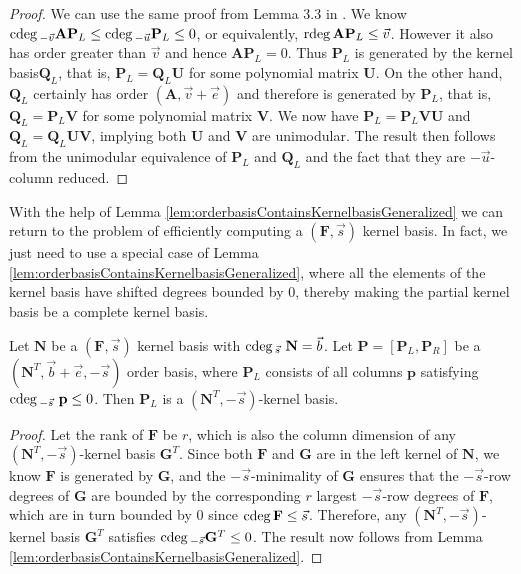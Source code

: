 \begin{proof}
We can use the same proof from Lemma 3.3 in \cite{za2012}. We know
${\rm cdeg}\,_{-\vec{v}}\mathbf{A}\mathbf{P}_{L}\le{\rm cdeg}\,_{-\vec{u}}\mathbf{P}_{L}\le0$,
or equivalently, ${\rm rdeg}\,\mathbf{A}\mathbf{P}_{L}\le\vec{v}$. However
it also has order greater than $\vec{v}$ and hence $\mathbf{A}\mathbf{P}_{L}=0$.
Thus $\mathbf{P}_{L}$ is generated by the kernel basis$\mathbf{Q}_{L}$,
that is, $\mathbf{P}_{L}=\mathbf{Q}_{L}\mathbf{U}$ for some polynomial
matrix $\mathbf{U}$. On the other hand, $\mathbf{Q}_{L}$ certainly
has order $\left(\mathbf{A},\vec{v}+\vec{e}\right)$ and therefore
is generated by $\mathbf{P}_{L}$, that is, $\mathbf{Q}_{L}=\mathbf{P}_{L}\mathbf{V}$
for some polynomial matrix $\mathbf{V}$. We now have $\mathbf{P}_{L}=\mathbf{P}_{L}\mathbf{V}\mathbf{U}$
and $\mathbf{Q}_{L}=\mathbf{Q}_{L}\mathbf{U}\mathbf{V}$, implying
both $\mathbf{U}$ and $\mathbf{V}$ are unimodular. The result then
follows from the unimodular equivalence of $\mathbf{P}_{L}$ and $\mathbf{Q}_{L}$
and the fact that they are $-\vec{u}$-column reduced.
\end{proof}
With the help of Lemma \ref{lem:orderbasisContainsKernelbasisGeneralized}
we can return to the problem of efficiently computing a $(\mathbf{F},\vec{s})$
kernel basis. In fact, we just need to use a special case of Lemma
\ref{lem:orderbasisContainsKernelbasisGeneralized}, where all the
elements of the kernel basis have shifted degrees bounded by $0$,
thereby making the partial kernel basis be a complete kernel basis. 
\begin{lem}
\label{lem:kernelBasisInOrderBasis} Let $\mathbf{N}$ be a $(\mathbf{F},\vec{s})$
kernel basis with ${\rm cdeg}\,_{\vec{s}}~\mathbf{N}=\vec{b}$. Let $\mathbf{P}=\left[\mathbf{P}_{L},\mathbf{P}_{R}\right]$
be a $\left(\mathbf{N}^{T},\vec{b}+\vec{e},-\vec{s}\right)$ order
basis, where $\mathbf{P}_{L}$ consists of all columns $\mathbf{p}$
satisfying ${\rm cdeg}\,_{-\vec{s}}~\mathbf{p}\le0$. Then $\mathbf{P}_{L}$
is a $(\mathbf{N}^{T},-\vec{s})$-kernel basis. \end{lem}
\begin{proof}
Let the rank of $\mathbf{F}$ be $r$, which is also the column dimension
of any $(\mathbf{N}^{T},-\vec{s})$-kernel basis $\mathbf{G}^{T}$.
Since both $\mathbf{F}$ and $\mathbf{G}$ are in the left kernel
of $\mathbf{N}$, we know $\mathbf{F}$ is generated by $\mathbf{G}$,
and the $-\vec{s}$-minimality of $\mathbf{G}$ ensures that the $-\vec{s}$-row
degrees of $\mathbf{G}$ are bounded by the corresponding $r$ largest
$-\vec{s}$-row degrees of $\mathbf{F}$, which are in turn bounded
by $0$ since ${\rm cdeg}\,\mathbf{F}\le\vec{s}$. Therefore, any $(\mathbf{N}^{T},-\vec{s})$-kernel
basis $\mathbf{G}^{T}$ satisfies ${\rm cdeg}\,_{-\vec{s}}\mathbf{G}^{T}\le0$.
The result now follows from Lemma \ref{lem:orderbasisContainsKernelbasisGeneralized}. 
\end{proof}
